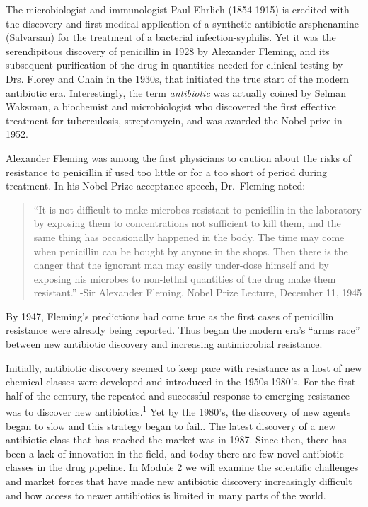 \documentclass[
]{book}
\begin{document}
The microbiologist and immunologist Paul Ehrlich (1854-1915) is credited with the discovery and first medical application of a synthetic antibiotic arsphenamine (Salvarsan) for the treatment of a bacterial infection-syphilis. Yet it was the serendipitous discovery of penicillin in 1928 by Alexander Fleming, and its subsequent purification of the drug in quantities needed for clinical testing by Drs. Florey and Chain in the 1930s, that initiated the true start of the modern antibiotic era. Interestingly, the term \emph{antibiotic} was actually coined by Selman Waksman, a biochemist and microbiologist who discovered the first effective treatment for tuberculosis, streptomycin, and was awarded the Nobel prize in 1952.

Alexander Fleming was among the first physicians to caution about the risks of resistance to penicillin if used too little or for a too short of period during treatment. In his Nobel Prize acceptance speech, Dr.~Fleming noted:

\begin{quote}
``It is not difficult to make microbes resistant to penicillin in the laboratory by exposing them to concentrations not sufficient to kill them, and the same thing has occasionally happened in the body. The time may come when penicillin can be bought by anyone in the shops. Then there is the danger that the ignorant man may easily under-dose himself and by exposing his microbes to non-lethal quantities of the drug make them resistant.'' -Sir Alexander Fleming, Nobel Prize Lecture, December 11, 1945
\end{quote}

By 1947, Fleming's predictions had come true as the first cases of penicillin resistance were already being reported. Thus began the modern era's ``arms race'' between new antibiotic discovery and increasing antimicrobial resistance.

Initially, antibiotic discovery seemed to keep pace with resistance as a host of new chemical classes were developed and introduced in the 1950s-1980's. For the first half of the century, the repeated and successful response to emerging resistance was to discover new antibiotics.\textsuperscript{1} Yet by the 1980's, the discovery of new agents began to slow and this strategy began to fail.. The latest discovery of a new antibiotic class that has reached the market was in 1987. Since then, there has been a lack of innovation in the field, and today there are few novel antibiotic classes in the drug pipeline. In Module 2 we will examine the scientific challenges and market forces that have made new antibiotic discovery increasingly difficult and how access to newer antibiotics is limited in many parts of the world.
\end{document}
